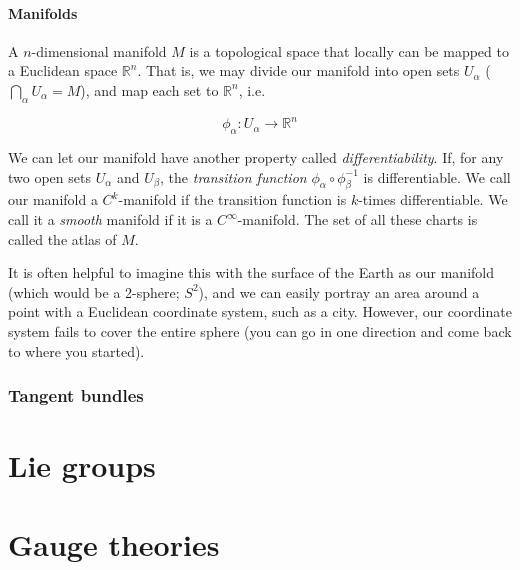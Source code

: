 \documentclass[10pt]{report}
\begin{document}
\begin{appendices}
	\subsubsection{Manifolds}
	A $n$-dimensional manifold $M$ is a topological space that locally can be mapped to a Euclidean space $\mathbb{R}^n$. That is, we may divide our manifold into open sets $U_\alpha$ ($\bigcap_\alpha U_\alpha = M$), and map each set to $\mathbb{R}^n$, i.e.
	
	\begin{equation}
		\phi_\alpha: U_\alpha \rightarrow \mathbb{R}^n
	\end{equation}
	
	We can let our manifold have another property called \emph{differentiability}. If, for any two open sets $U_\alpha$ and $U_\beta$, the \emph{transition function} $\phi_\alpha \circ \phi_\beta^{-1}$ is differentiable. We call our manifold a $C^k$-manifold if the transition function is $k$-times differentiable. We call it a \emph{smooth} manifold if it is a $C^\infty$-manifold. The set of all these charts is called the atlas of $M$.
	
	It is often helpful to imagine this with the surface of the Earth as our manifold (which would be a 2-sphere; $S^2$), and we can easily portray an area around a point with a Euclidean coordinate system, such as a city. However, our coordinate system fails to cover the entire sphere (you can go in one direction and come back to where you started).\\
	
	
	\subsection{Tangent bundles}
	
	\chapter{Lie groups}
	
	\chapter{Gauge theories}
	
	\end{appendices}
	
\end{document}
